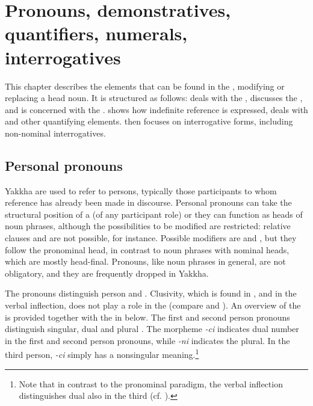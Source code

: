 ﻿\chapter{Pronouns, demonstratives, quantifiers, numerals, interrogatives}\label{ch-pron}
  
This chapter describes the elements that can be found in the ,  mo\-di\-fying or replacing a head noun. It is structured as follows:  deals with the ,  discusses the , and  is concerned with the .  shows how indefinite reference is expressed,  deals with  and other quantifying elements.  then focuses on interrogative forms, including non-nominal interrogatives. 
  
\section{Personal pronouns}\label{pers-pron}

Yakkha  are used to refer to persons, typically those participants to whom reference has already been made in discourse. Personal pronouns can take the structural position of a  (of any participant role) or they can function as  heads of noun phrases, although the possibilities to be modified are restricted: relative clauses and  are not possible, for instance. Possible modifiers are  and , but they follow the pronominal head, in contrast to noun phrases with nominal heads, which are mostly head-final. Pronouns, like noun phrases in general, are not obligatory, and they are frequently dropped in Yakkha.

The pronouns distinguish person and . Clusivity, which is found  in ,  and in the verbal inflection,  does not play a role in the  (compare \Next[a] and \Next[b]). An overview of the  is provided together with the  in  below. The first and second person pronouns distinguish singular, dual and plural . The morpheme \emph{-ci} indicates dual number in the first and second person pronouns, while \emph{-ni} indicates the plural. In the third person, \emph{-ci} simply has a nonsingular meaning.\footnote{Note that in contrast to the pronominal paradigm, the verbal inflection distinguishes dual  also in the third  (cf.  ).} 



